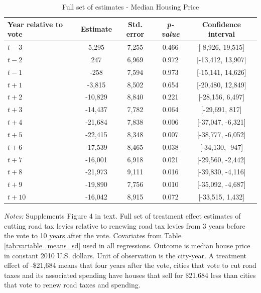 \begin{table}[htbp]
    \centering
    \caption{Full set of estimates - Median Housing Price}
    \label{tab:median_sale_amount_full}
    \begin{tabular}{p{3cm}cccc}
        \hline
        \textbf{Year relative to vote} & \textbf{Estimate} & \textbf{Std. error} & \textbf{\textit{p-value}} & \textbf{Confidence interval} \\
        \hline
        $t - 3$  & 5,295   & 7,255  & 0.466  & [-8,926, 19,515] \\
        $t - 2$  & 247     & 6,969  & 0.972  & [-13,412, 13,907] \\
        $t - 1$  & -258    & 7,594  & 0.973  & [-15,141, 14,626] \\
        $t + 1$  & -3,815  & 8,502  & 0.654  & [-20,480, 12,849] \\
        $t + 2$  & -10,829 & 8,840  & 0.221  & [-28,156, 6,497] \\
        $t + 3$  & -14,437 & 7,782  & 0.064  & [-29,691, 817] \\
        $t + 4$  & -21,684 & 7,838  & 0.006  & [-37,047, -6,321] \\
        $t + 5$  & -22,415 & 8,348  & 0.007  & [-38,777, -6,052] \\
        $t + 6$  & -17,539 & 8,465  & 0.038  & [-34,130, -947] \\
        $t + 7$  & -16,001 & 6,918  & 0.021  & [-29,560, -2,442] \\
        $t + 8$  & -21,973 & 9,111  & 0.016  & [-39,830, -4,116] \\
        $t + 9$  & -19,890 & 7,756  & 0.010  & [-35,092, -4,687] \\
        $t + 10$ & -16,042 & 8,915  & 0.072  & [-33,515, 1,432] \\
        \hline
    \end{tabular} 
    \begin{tablenotes}
        \small
        \item \textit{Notes:} Supplements Figure 4 in text. Full set of treatment effect estimates of cutting road tax levies relative to renewing road tax levies from 3 years before the vote to 10 years after the vote. Covariates from Table \ref{tab:variable_means_sd} used in all regressions. Outcome is median house price in constant 2010 U.S. dollars. Unit of observation is the city-year. A treatment effect of -\$21,684 means that four years after the vote, cities that vote to cut road taxes and its associated spending have houses that sell for \$21,684 less than cities that vote to renew road taxes and spending.
    \end{tablenotes}
\end{table}

